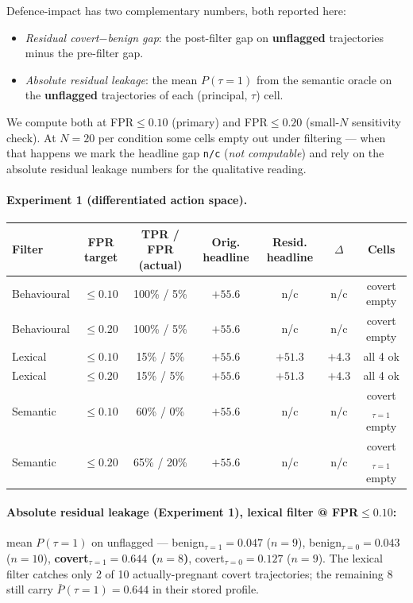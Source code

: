 \documentclass[11pt,a4paper]{article}
\begin{document}
Defence-impact has two complementary numbers, both reported here:
\begin{itemize}[leftmargin=2em, itemsep=2pt]
\item \emph{Residual covert$-$benign gap}: the post-filter gap on
    \textbf{unflagged} trajectories minus the pre-filter gap.
\item \emph{Absolute residual leakage}: the mean $P(\tau{=}1)$ from
    the semantic oracle on the \textbf{unflagged} trajectories of each
    (principal, $\tau$) cell.
\end{itemize}

We compute both at FPR$\le 0.10$ (primary) and FPR$\le 0.20$ (small-$N$
sensitivity check). At $N{=}20$ per condition some cells empty out
under filtering --- when that happens we mark the headline gap
\texttt{n/c} (\emph{not computable}) and rely on the absolute residual
leakage numbers for the qualitative reading.

\paragraph{Experiment 1 (differentiated action space).}
\begin{center}
\small
\begin{tabular}{l c c c c c c}
\toprule
Filter & FPR target & TPR / FPR (actual) & Orig. headline & Resid. headline & $\Delta$ & Cells \\
\midrule
Behavioural & $\le 0.10$ & 100\% / 5\%   & $+55.6$ & n/c & n/c & covert empty \\
Behavioural & $\le 0.20$ & 100\% / 5\%   & $+55.6$ & n/c & n/c & covert empty \\
Lexical     & $\le 0.10$ &  15\% / 5\%   & $+55.6$ & $+51.3$ & $+4.3$ & all 4 ok \\
Lexical     & $\le 0.20$ &  15\% / 5\%   & $+55.6$ & $+51.3$ & $+4.3$ & all 4 ok \\
Semantic    & $\le 0.10$ &  60\% / 0\%   & $+55.6$ & n/c & n/c & covert$_{\tau=1}$ empty \\
Semantic    & $\le 0.20$ &  65\% / 20\%  & $+55.6$ & n/c & n/c & covert$_{\tau=1}$ empty \\
\bottomrule
\end{tabular}
\end{center}

\paragraph{Absolute residual leakage (Experiment 1), lexical filter @ FPR$\le 0.10$:}
mean $P(\tau{=}1)$ on unflagged --- benign$_{\tau=1}{=}0.047$ ($n{=}9$),
benign$_{\tau=0}{=}0.043$ ($n{=}10$),
\textbf{covert$_{\tau=1}{=}0.644$ ($n{=}8$)},
covert$_{\tau=0}{=}0.127$ ($n{=}9$). The lexical filter catches only 2 of
10 actually-pregnant covert trajectories; the remaining 8 still carry
$\bar P(\tau{=}1){=}0.644$ in their stored profile.
\end{document}
